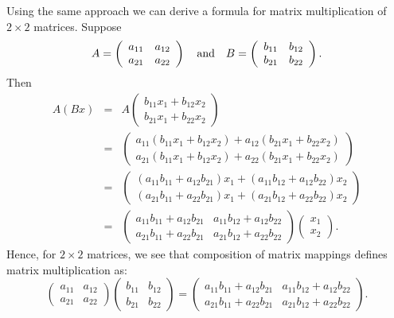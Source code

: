 Using the same approach we can derive a formula for matrix
multiplication of $2\times 2$ matrices.  Suppose
\[
A= \left(\begin{array}{rr} a_{11} & a_{12}\\ a_{21} &
a_{22}\end{array}\right)
\quad\mbox{and}\quad
B= \left(\begin{array}{rr} b_{11} & b_{12}\\ b_{21} &
b_{22}\end{array}\right).
\]
Then
\begin{eqnarray*}
A(Bx) & = & A \left(\begin{array}{c} b_{11}x_1+b_{12}x_2 \\
b_{21}x_1+b_{22}x_2 \end{array}\right)\\
 & = & \left(\begin{array}{c} a_{11}(b_{11}x_1+b_{12}x_2)
+a_{12}(b_{21}x_1+b_{22}x_2)  \\
a_{21}(b_{11}x_1+b_{12}x_2) +
a_{22}(b_{21}x_1+b_{22}x_2) \end{array}\right) \\
 & = & \left(\begin{array}{c} (a_{11}b_{11}+a_{12}b_{21})x_1+
(a_{11}b_{12}+a_{12}b_{22})x_2  \\
(a_{21}b_{11}+a_{22}b_{21})x_1+
(a_{21}b_{12}+a_{22}b_{22})x_2 \end{array}\right) \\
& = & \left(\begin{array}{rr} a_{11}b_{11}+a_{12}b_{21} &
a_{11}b_{12}+a_{12}b_{22}\\
a_{21}b_{11}+a_{22}b_{21} & a_{21}b_{12}+a_{22}b_{22}
\end{array}\right)
        \left(\begin{array}{c} x_1 \\ x_2 \end{array} \right).
\end{eqnarray*}
Hence, for $2\times 2$ matrices, we see that composition of
matrix mappings defines matrix multiplication
as:
\begin{equation}  \label{2x2mult}
\left(\begin{array}{rr} a_{11} & a_{12}\\ a_{21} &
a_{22}\end{array}\right)
\left(\begin{array}{rr} b_{11} & b_{12}\\ b_{21} &
b_{22}\end{array}\right)
=\left(\begin{array}{rr} a_{11}b_{11}+a_{12}b_{21} &
a_{11}b_{12}+a_{12}b_{22}
\\ a_{21}b_{11}+a_{22}b_{21} & a_{21}b_{12}+a_{22}b_{22}
\end{array}\right).
\end{equation}

